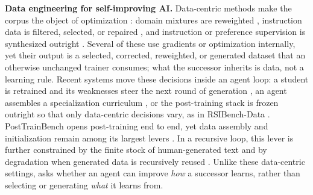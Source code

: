 \textbf{Data engineering for self-improving AI.}
Data-centric methods make the corpus the object of optimization \citep{zha2023datacentric}: domain
mixtures are reweighted \citep{xie2023doremi,fan2024doge}, instruction data is filtered, selected, or
repaired \citep{chen2023alpagasus,liu2023deita,xia2024less,chen2024clear}, and instruction or
preference supervision is synthesized outright \citep{wang2022selfinstruct,xu2023wizardlm,
cui2023ultrafeedback}.  Several of these use gradients or optimization internally, yet their output
is a selected, corrected, reweighted, or generated dataset that an otherwise unchanged trainer
consumes; what the successor inherits is data, not a learning rule.  Recent systems move these
decisions inside an agent loop: a student is retrained and its weaknesses steer the next round of
generation \citep{khan2024dataenvgym}, an agent assembles a specialization curriculum
\citep{luo2026dataagent}, or the post-training stack is frozen outright so that only data-centric
decisions vary, as in RSIBench-Data \citep{meng2026rsibench}.  PostTrainBench opens post-training end
to end, yet data assembly and initialization remain among its largest levers
\citep{rank2026posttrainbench}.  In a recursive loop, this lever is further constrained by the finite
stock of human-generated text \citep{villalobos2022rundata} and by degradation when generated data is
recursively reused \citep{shumailov2023curse}.  Unlike these data-centric settings, \ai{} asks
whether an agent can improve \emph{how} a successor learns, rather than selecting or generating
\emph{what} it learns from.

